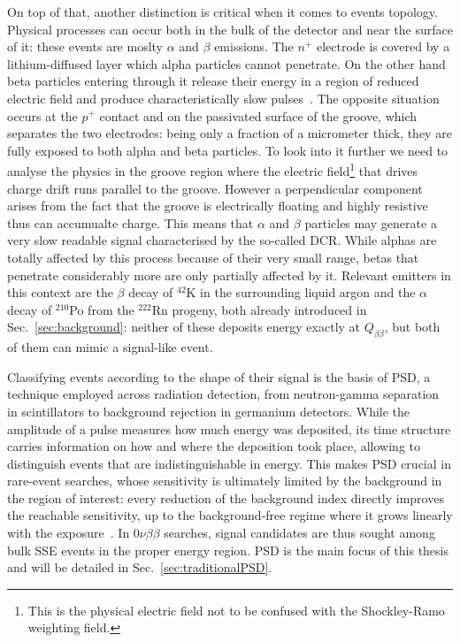 On top of that, another distinction is critical when it comes to events topology. Physical processes can occur both in the bulk of the detector and near the surface of it: these events are moslty $\alpha$ and $\beta$ emissions. The $n^+$ electrode is covered by a lithium-diffused layer which alpha particles cannot penetrate. On the other hand beta particles entering through it release their energy in a region of reduced electric field and produce characteristically slow pulses~\cite{L1000-design}. The opposite situation occurs at the $p^+$ contact and on the passivated surface of the groove, which separates the two electrodes: being only a fraction of a micrometer thick, they are fully exposed to both alpha and beta particles. To look into it further we need to analyse the physics in the groove region where the electric field\footnote{This is the physical electric field not to be confused with the Shockley-Ramo weighting field.} that drives charge drift runs parallel to the groove. However a perpendicular component arises from the fact that the groove is electrically floating and highly resistive thus can accumualte charge. This means that $\alpha$ and $\beta$ particles may generate a very slow readable signal characterised by the so-called \ac{DCR}. While alphas are totally affected by this process because of their very small range, betas that penetrate considerably more are only partially affected by it. Relevant emitters in this context are the $\beta$ decay of $^{42}$K in the surrounding liquid argon and the $\alpha$ decay of $^{210}$Po from the $^{222}$Rn progeny, both already introduced in Sec.~\ref{sec:background}: neither of these deposits energy exactly at $Q_{\beta\beta}$, but both of them can mimic a signal-like event.

Classifying events according to the shape of their signal is the basis of \ac{PSD}, a technique employed across radiation detection, from neutron-gamma separation in scintillators to background rejection in germanium detectors. While the amplitude of a pulse measures how much energy was deposited, its time structure carries information on how and where the deposition took place, allowing to distinguish events that are indistinguishable in energy. This makes \ac{PSD} crucial in rare-event searches, whose sensitivity is ultimately limited by the background in the region of interest: every reduction of the background index directly improves the reachable sensitivity, up to the background-free regime where it grows linearly with the exposure~\cite{LEGEND:GeDet}. In $0\nu\beta\beta$ searches, signal candidates are thus sought among bulk \ac{SSE} events in the proper energy region. \ac{PSD} is the main focus of this thesis and will be detailed in Sec.~\ref{sec:traditionalPSD}.

